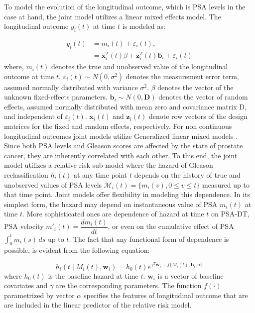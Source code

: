 To model the evolution of the longitudinal outcome, which is PSA levels in the case at hand, the joint model utilizes a linear mixed effects model. The longitudinal outcome $y_i(t)$ at time $t$ is modeled as:

\begin{equation*}
\begin{split}
y_i(t) &= m_i(t) + \varepsilon_i(t), \\
&= \boldsymbol{x}_i^T(t) \beta + \boldsymbol{z}_i^T(t) \boldsymbol{b}_i + \varepsilon_i(t)
\end{split}
\end{equation*}
where, $m_i(t)$ denotes the true and unobserved value of the longitudinal outcome at time $t$. $\varepsilon_i(t) \sim N(0, \sigma^2)$ denotes the measurement error term, assumed normally distributed with variance $\sigma^2$. $\beta$ denotes the vector of the unknown fixed-effects parameters. $\boldsymbol{b}_i \sim N(0, \boldsymbol{D})$ denotes the vector of random effects, assumed normally distributed with mean zero and covariance matrix D, and independent of $\varepsilon_i(t)$. $\boldsymbol{x}_i(t)$ and $\boldsymbol{z}_i(t)$ denote row vectors of the design matrices for the fixed and random effects, respectively. For non continuous longitudinal outcomes joint models utilize Generalized linear mixed models \citep{rizopoulos2012joint}.\\

Since both PSA levels and Gleason scores are affected by the state of prostate cancer, they are inherently correlated with each other. To this end, the joint model utilizes a relative risk sub-model where the hazard of Gleason reclassification $h_i(t)$ at any time point $t$ depends on the history of true and unobserved values of PSA levels $\mathcal{M}_i(t) = \{m_i(v), 0\leq v \leq t\}$ measured up to that time point. Joint models offer flexibility in modeling this dependence. In its simplest form, the hazard may depend on instantaneous value of PSA $m_i(t)$ at time $t$. More sophisticated ones are dependence of hazard at time $t$ on PSA-DT, PSA velocity $m'_i(t) = \dfrac{d m_i(t)}{dt}$, or even on the cumulative effect of PSA $\int_0^t m_i(s) \,ds$ up to $t$. The fact that any functional form of dependence is possible, is evident from the following equation:

\begin{equation*}
h_i(t \mid M_i(t), \boldsymbol{w}_i) = h_0(t) e^{\gamma^T\boldsymbol{w}_i + f\{M_i(t), \boldsymbol{b}_i, \alpha\}}
\end{equation*}
where $h_0(t)$ is the baseline hazard at time $t$. $\boldsymbol{w}_i$ is a vector of baseline covariates and $\gamma$ are the corresponding parameters. The function $f(\cdot)$ parametrized by vector $\alpha$ specifies the features of longitudinal outcome that are are included in the linear predictor of the relative risk model.\\

